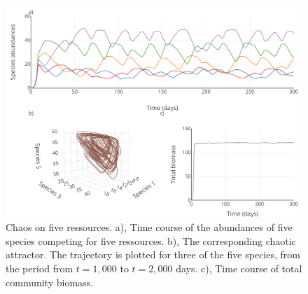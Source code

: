 \begin{figure}[H]
\begin{center} 
 \includegraphics[width=1\textwidth]{../Code/Figures/Figure_2.pdf}
  \caption{Chaos on five ressources. a), Time course of the abundances of five species competing for five ressources. b), The corresponding chaotic attractor. The trajectory is plotted for three of the five species, from the period from $t= 1,000$ to $t=2,000$ days. c), Time course of total community biomass.}
  \label{figures:Fig2}
\end{center}
\end{figure}
